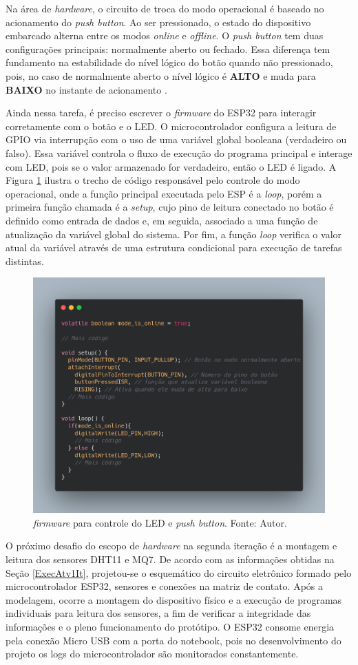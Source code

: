 Na área de \textit{hardware}, o circuito de troca do modo operacional é baseado no acionamento do \textit{push button}. Ao ser 
pressionado, o estado do dispositivo embarcado alterna entre os modos \textit{online} e \textit{offline}. O \textit{push button} 
tem duas configurações principais: normalmente aberto ou fechado. Essa diferença tem fundamento na estabilidade do nível lógico do botão 
quando não pressionado, pois, no caso de normalmente aberto o nível lógico é \textbf{ALTO} e muda para \textbf{BAIXO} no instante de acionamento \cite{arduino-docs}.

Ainda nessa tarefa, é preciso escrever o \textit{firmware} do ESP32 para interagir corretamente com o botão e o LED. O microcontrolador configura a 
leitura de GPIO via interrupção com o uso de uma variável global booleana (verdadeiro ou falso). Essa variável controla o fluxo de execução do programa principal 
e interage com LED, pois se o valor armazenado for verdadeiro, então o LED é ligado. A Figura \ref{figPushButtonFirmware} ilustra o trecho de código responsável pelo controle do modo operacional, onde a função principal 
executada pelo ESP é a \textit{loop}, porém a primeira função chamada é a \textit{setup}, cujo pino de leitura conectado 
no botão é definido como entrada de dados e, em seguida, associado a uma função de atualização da variável global do sistema. Por fim, a função \textit{loop} 
verifica o valor atual da variável através de uma estrutura condicional para execução de tarefas distintas. 

\begin{figure}[ht]
    \centering
    \includegraphics[width=.62\textwidth]{img/push-button-firrmware.png}
    \caption{\textit{firmware} para controle do LED e \textit{push button}. Fonte: Autor.}\label{figPushButtonFirmware}
\end{figure}

O próximo desafio do escopo de \textit{hardware} na segunda iteração é a montagem e leitura dos sensores DHT11 e MQ7. De acordo 
com as informações obtidas na Seção \ref{ExecAtv1It}, projetou-se o esquemático do circuito eletrônico formado pelo microcontrolador ESP32, sensores e conexões na matriz de contato. 
Após a modelagem, ocorre a montagem do dispositivo físico e a execução de programas individuais para leitura dos sensores, a fim de verificar a 
integridade das informações e o pleno funcionamento do protótipo. O ESP32 consome energia pela conexão Micro USB com a porta do notebook, pois 
no desenvolvimento do projeto os logs do microcontrolador são monitorados constantemente. 

